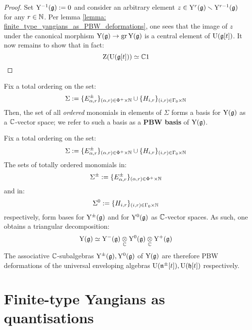                 \begin{proof}
                    Set $\mathrm{Y}^{-1}(\mathfrak{g}) := 0$ and consider an arbitrary element $z \in \mathrm{Y}^r(\mathfrak{g}) \smallsetminus \mathrm{Y}^{r - 1}(\mathfrak{g})$ for any $r \in \mathbb{N}$. Per lemma \ref{lemma: finite_type_yangians_as_PBW_deformations}, one sees that the image of $z$ under the canonical morphism $\mathrm{Y}(\mathfrak{g}) \to \operatorname{gr} \mathrm{Y}(\mathfrak{g})$ is a central element of $\mathrm{U}(\mathfrak{g}[t])$. It now remains to show that in fact:
                        $$\mathrm{Z}( \mathrm{U}(\mathfrak{g}[t]) ) \simeq \mathbb{C} 1$$
                \end{proof}
            \begin{theorem} \label{theorem: PBW_bases_for_finite_type_yangians}
                \cite[Proposition 12.1.8]{chari_pressley_quantum_groups} Fix a total ordering on the set:
                    $$\Sigma := \{E_{\alpha, r}^{\pm}\}_{(\alpha, r) \in \Phi^+ \x \N} \cup \{H_{i, r}\}_{(i, r) \in \Gamma_0 \x \N}$$
                Then, the set of all \textit{ordered} monomials in elements of $\Sigma$ forms a basis for $\mathrm{Y}(\mathfrak{g})$ as a $\mathbb{C}$-vector space; we refer to such a basis as a \textbf{PBW basis} of $\mathrm{Y}(\mathfrak{g})$. 
            \end{theorem}
            \begin{corollary} \label{coro: triangular_decompositions_of_finite_type_yangians}
                Fix a total ordering on the set:
                    $$\Sigma := \{E_{\alpha, r}^{\pm}\}_{(\alpha, r) \in \Phi^+ \x \N} \cup \{H_{i, r}\}_{(i, r) \in \Gamma_0 \x \N}$$
                The sets of totally ordered monomials in:
                    $$\Sigma^{\pm} := \{E_{\alpha, r}^{\pm}\}_{(\alpha, r) \in \Phi^+ \x \N}$$
                and in:
                    $$\Sigma^0 := \{H_{i, r}\}_{(i, r) \in \Gamma_0 \x \N}$$
                respectively, form bases for $\mathrm{Y}^{\pm}(\mathfrak{g})$ and for $\mathrm{Y}^0(\mathfrak{g})$ as $\mathbb{C}$-vector spaces. As such, one obtains a triangular decomposition:
                    $$\rmY(\g) \cong \rmY^-(\g) \tensor_{\bbC} \rmY^0(\g) \tensor_{\bbC} \rmY^+(\g)$$
                The associative $\mathbb{C}$-subalgebras $\mathrm{Y}^{\pm}(\mathfrak{g}), \mathrm{Y}^0(\mathfrak{g})$ of $\mathrm{Y}(\mathfrak{g})$ are therefore PBW deformations of the universal enveloping algebras $\mathrm{U}(\mathfrak{n}^{\pm}[t]), \mathrm{U}(\mathfrak{h}[t])$ respectively. 
            \end{corollary}

    \section{Finite-type Yangians as quantisations}
